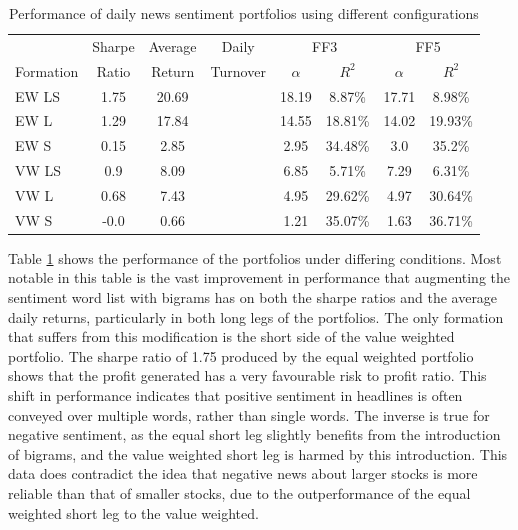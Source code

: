 \begin{table}[!ht]
\begin{center}
\begin{tabular}{lccccccc}
      \toprule
      & Sharpe &  Average & Daily & \multicolumn{2}{c}{FF3} & \multicolumn{2}{c}{FF5} \\
      \cmidrule(lr){5-6}
      \cmidrule(lr){7-8}
      Formation & Ratio & Return & Turnover & $\alpha$ & $R^2$ & $\alpha$ & $R^2$ \\
      \midrule
      EW LS & 1.75 & 20.69 & & 18.19 & 8.87\% & 17.71 & 8.98\% \\
      EW L & 1.29 & 17.84 & & 14.55 & 18.81\% & 14.02 & 19.93\% \\
      EW S & 0.15 & 2.85 & & 2.95 & 34.48\% & 3.0 & 35.2\% \\
      VW LS & 0.9 & 8.09 & & 6.85 & 5.71\% & 7.29 & 6.31\% \\
      VW L & 0.68 & 7.43 & & 4.95 & 29.62\% & 4.97 & 30.64\% \\
      VW S & -0.0 & 0.66 & & 1.21 & 35.07\% & 1.63 & 36.71\% \\
      \bottomrule
\end{tabular}
\caption[Day ahead performance different configurations]{Performance of daily news sentiment portfolios using different configurations}
\label{tab:other-configs-day-ahead}
\end{center}
\end{table}

Table \ref{tab:other-configs-day-ahead} shows the performance of the portfolios under differing conditions. Most notable in this table is the vast improvement in performance that augmenting the sentiment word list with bigrams has on both the sharpe ratios and the average daily returns, particularly in both long legs of the portfolios. The only formation that suffers from this modification is the short side of the value weighted portfolio. The sharpe ratio of 1.75 produced by the equal weighted portfolio shows that the profit generated has a very favourable risk to profit ratio. This shift in performance indicates that positive sentiment in headlines is often conveyed over multiple words, rather than single words. The inverse is true for negative sentiment, as the equal short leg slightly benefits from the introduction of bigrams, and the value weighted short leg is harmed by this introduction. This data does contradict the idea that negative news about larger stocks is more reliable than that of smaller stocks, due to the outperformance of the equal weighted short leg to the value weighted.


